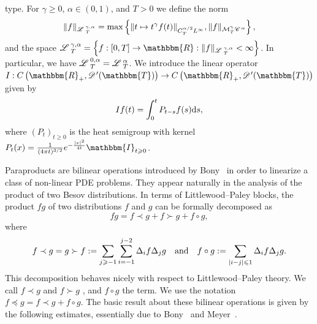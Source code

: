 \begin{appendices}
type. For $\gamma \geqslant 0$, $\alpha \in (0, 1)$, and $T > 0$ we define the
norm
\[ \| f \|_{\mathscr{L} \hspace{.2em}^{\gamma, \alpha}_T} = \max \left\{ \| t \mapsto t^{\gamma} f
   (t) \|_{C^{\alpha / 2}_T L^{\infty}}, \| f \|_{\mathcal{M}^{\gamma}_T
   \mathscr{C} \hspace{.1em}^{\alpha}} \right\}, \]
and the space $\LL^{\gamma, \alpha}_T = \left\{ f : [0, T] \rightarrow
\mathbbm{R}: \| f \|_{\LL^{\gamma, \alpha}_T} < \infty \right\}$. In
particular, we have $\mathscr{L} \hspace{.2em}^{0, \alpha}_T = \mathscr{L} \hspace{.2em}^{\alpha}_T$. We introduce the
linear operator $I : C \left( \mathbbm{R}_+, \DD' (\mathbbm{T}) \right)
\rightarrow C \left( \mathbbm{R}_+, \DD' (\mathbbm{T}) \right)$ given by
\[ I f (t) = \int_0^t P_{t - s} f (s) \mathrm{d} s, \]
where $(P_t)_{t \geqslant 0}$ is the heat semigroup with kernel $P_t (x) =
\frac{1}{(4 \mathpi t)^{3 / 2}} e^{- \frac{| x |^2}{4 t}} \mathbbm{I}_{t
\geqslant 0}$.

Paraproducts are bilinear operations introduced by Bony~{\cite{Bony1981}} in
order to linearize a class of non-linear PDE problems. They appear naturally
in the analysis of the product of two Besov distributions. In terms of
Littlewood--Paley blocks, the product $fg$ of two distributions $f$ and $g$
can be formally decomposed as
\[ fg = f \prec g + f \succ g + f \circ g, \]
where
\[ f \prec g = g \succ f := \sum_{j \geqslant - 1} \sum_{i = - 1}^{j - 2}
   \Delta_i f \Delta_j g \quad \text{and} \quad f \circ g := \sum_{|i -
   j| \leqslant 1} \Delta_i f \Delta_j g. \]
This decomposition behaves nicely with respect to Littlewood--Paley theory. We
call $f \prec g$ and $f \succ g$ , and $f \circ g$ the
 term. We use the notation $f \preccurlyeq g = f \prec g +
f \circ g$. The basic result about these bilinear operations is given by the
following estimates, essentially due to Bony~{\cite{Bony1981}} and
Meyer~{\cite{Meyer1981}}.


\end{appendices}
